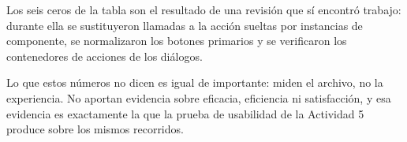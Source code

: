 Los seis ceros de la tabla son el resultado de una revisión que sí encontró trabajo: durante ella
se sustituyeron llamadas a la acción sueltas por instancias de componente, se normalizaron los
botones primarios y se verificaron los contenedores de acciones de los diálogos.

Lo que estos números no dicen es igual de importante: miden el archivo, no la experiencia. No
aportan evidencia sobre eficacia, eficiencia ni satisfacción, y esa evidencia es exactamente la que
la prueba de usabilidad de la Actividad 5 produce sobre los mismos recorridos.
